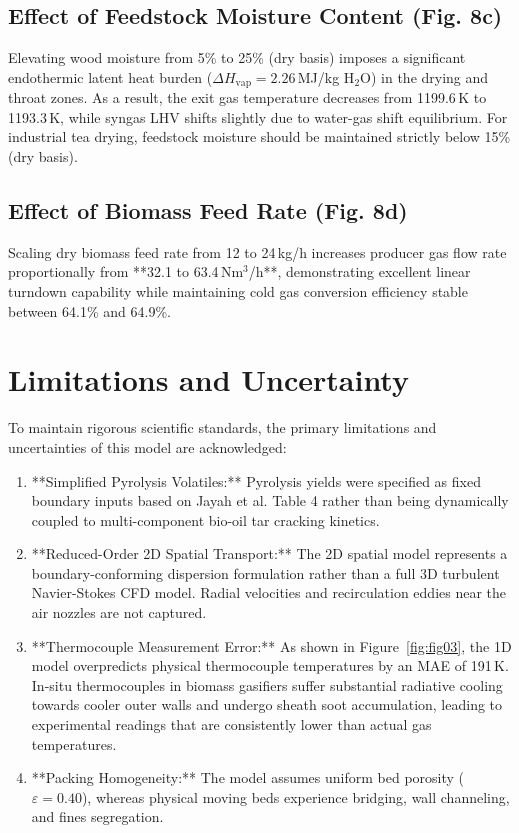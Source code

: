 \documentclass[11pt,a4paper]{article}
\begin{document}
\subsection{Effect of Feedstock Moisture Content (Fig. 8c)}
Elevating wood moisture from 5\% to 25\% (dry basis) imposes a significant endothermic latent heat burden ($\Delta H_{\text{vap}} = 2.26$\,MJ/kg H$_2$O) in the drying and throat zones. As a result, the exit gas temperature decreases from 1199.6\,K to 1193.3\,K, while syngas LHV shifts slightly due to water-gas shift equilibrium. For industrial tea drying, feedstock moisture should be maintained strictly below 15\% (dry basis).

\subsection{Effect of Biomass Feed Rate (Fig. 8d)}
Scaling dry biomass feed rate from 12 to 24\,kg/h increases producer gas flow rate proportionally from **32.1 to 63.4\,Nm$^3$/h**, demonstrating excellent linear turndown capability while maintaining cold gas conversion efficiency stable between 64.1\% and 64.9\%.

\section{Limitations and Uncertainty}
To maintain rigorous scientific standards, the primary limitations and uncertainties of this model are acknowledged:
\begin{enumerate}[leftmargin=1.5em]
    \item **Simplified Pyrolysis Volatiles:** Pyrolysis yields were specified as fixed boundary inputs based on Jayah et al. Table 4 rather than being dynamically coupled to multi-component bio-oil tar cracking kinetics.
    \item **Reduced-Order 2D Spatial Transport:** The 2D spatial model represents a boundary-conforming dispersion formulation rather than a full 3D turbulent Navier-Stokes CFD model. Radial velocities and recirculation eddies near the air nozzles are not captured.
    \item **Thermocouple Measurement Error:** As shown in Figure~\ref{fig:fig03}, the 1D model overpredicts physical thermocouple temperatures by an MAE of 191\,K. In-situ thermocouples in biomass gasifiers suffer substantial radiative cooling towards cooler outer walls and undergo sheath soot accumulation, leading to experimental readings that are consistently lower than actual gas temperatures.
    \item **Packing Homogeneity:** The model assumes uniform bed porosity ($\varepsilon = 0.40$), whereas physical moving beds experience bridging, wall channeling, and fines segregation.
\end{enumerate}
\end{document}
